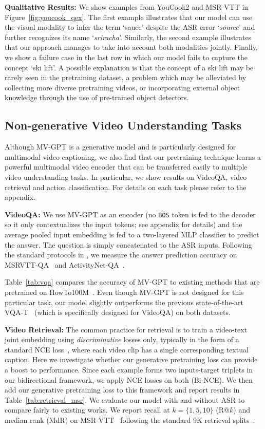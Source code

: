 \documentclass[10pt,twocolumn,letterpaper]{article}
\begin{document}
\noindent\textbf{Qualitative Results:} 
We show  examples from YouCook2 and MSR-VTT in Figure~\ref{fig:youcook_qex}.
The first example illustrates that our model can use the visual modality to infer the term `sauce' despite the ASR error `\textit{source}' and further recognizes its name `\textit{sriracha}'.
Similarly, the second example illustrates that our approach manages to take into account both modalities jointly. 
Finally, we show a failure case in the last row in which our model fails to capture the concept `ski lift'.
A possible explanation is that the concept of a ski lift may be rarely seen in the pretraining dataset, a problem which may be alleviated by collecting more diverse pretraining videos, or incorporating external object knowledge through the use of pre-trained object detectors. 




\subsection{Non-generative Video Understanding Tasks}
Although MV-GPT is a generative model and is particularly designed for multimodal video captioning, we also find that our pretraining technique learns a powerful multimodal video encoder that can be transferred easily to multiple video understanding tasks.
In particular, we show results on VideoQA, video retrieval and action classification.
For details on each task please refer to the appendix.


\noindent\textbf{VideoQA:} 
We use MV-GPT as an encoder (no \texttt{BOS} token is fed to the decoder so it only contextualizes the input tokens; see appendix for details) and the average pooled input embedding is fed to a two-layered MLP classifier to predict the answer.
The question is simply concatenated to the ASR inputs.
Following the standard protocols in \cite{yang2020just,seo2021look}, we measure the answer prediction accuracy on MSRVTT-QA~\cite{xu2017video} and ActivityNet-QA~\cite{yu2019activitynet}. 

Table~\ref{tab:vqa} compares the accuracy  of MV-GPT to existing methods that are pretrained on HowTo100M~\cite{miech2019howto100m}.
Even though MV-GPT is not designed for this particular task, our model slightly outperforms the previous state-of-the-art VQA-T~\cite{yang2020just} (which is specifically designed for VideoQA) on both datasets.

\noindent\textbf{Video Retrieval:} 
The common practice for retrieval is to train a video-text joint embedding using \textit{discriminative} losses only, typically in the form of a standard NCE loss~\cite{gutmann2010noise}, where each video clip has a single corresponding textual caption. Here we investigate whether our generative pretraining loss can provide a boost to performance.
Since each example forms two inputs-target triplets in our bidirectional framework, we apply NCE losses on both (Bi-NCE). We then add our generative pretraining loss to this framework and report results in Table~\ref{tab:retrieval_msr}. We evaluate our model with and without ASR to compare fairly to existing works.
We report recall at $k=\{1, 5, 10\}$ (R@$k$) and median rank (MdR) on MSR-VTT~\cite{xu2016msr} following the standard 9K retrieval splits~\cite{yu2018joint}.
\end{document}
